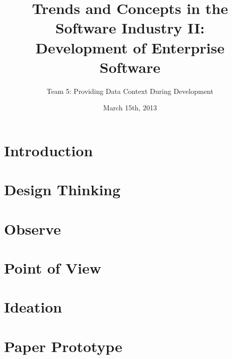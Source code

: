 \documentclass[runningheads]{llncs}
\begin{document}
\mainmatter
\title{Trends and Concepts in the Software Industry II: \\ Development of Enterprise Software}
\author{Team 5: Providing Data Context During Development}
\date{March 15th, 2013}
\maketitle

\newpage


\section{Introduction}

\section{Design Thinking}



\section{Observe}

\section{Point of View}

\section{Ideation}

\section{Paper Prototype}
\end{document}

